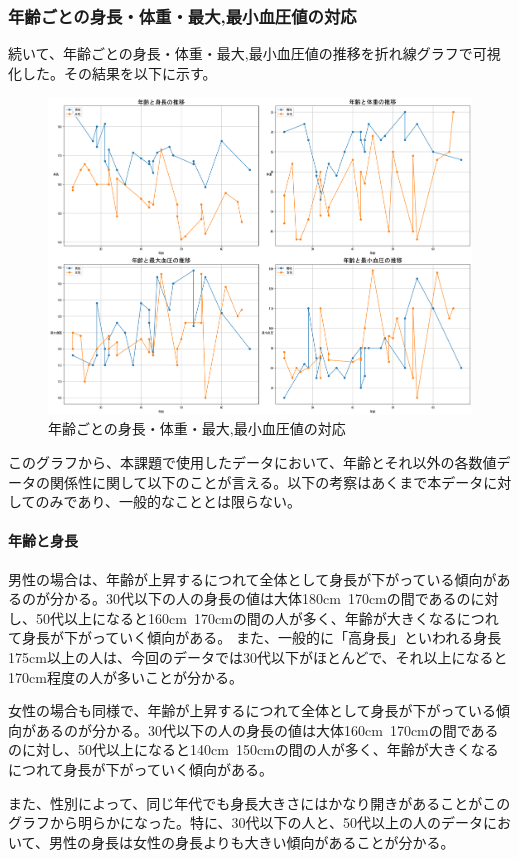 \documentclass[dvipdfmx]{jsarticle}
\begin{document}
    \subsubsection{年齢ごとの身長・体重・最大,最小血圧値の対応}
    続いて、年齢ごとの身長・体重・最大,最小血圧値の推移を折れ線グラフで可視化した。その結果を以下に示す。
    \begin{figure}[H]
        \centering
        \includegraphics[scale=0.32]{images/allgender/age_tarnsition.png}
        \caption{年齢ごとの身長・体重・最大,最小血圧値の対応}
    \end{figure}
    このグラフから、本課題で使用したデータにおいて、年齢とそれ以外の各数値データの関係性に関して以下のことが言える。以下の考察はあくまで本データに対してのみであり、一般的なこととは限らない。
    \paragraph{年齢と身長}
    男性の場合は、年齢が上昇するにつれて全体として身長が下がっている傾向があるのが分かる。30代以下の人の身長の値は大体180cm~170cmの間であるのに対し、50代以上になると160cm~170cmの間の人が多く、年齢が大きくなるにつれて身長が下がっていく傾向がある。
    また、一般的に「高身長」といわれる身長175cm以上の人は、今回のデータでは30代以下がほとんどで、それ以上になると170cm程度の人が多いことが分かる。\par
    女性の場合も同様で、年齢が上昇するにつれて全体として身長が下がっている傾向があるのが分かる。30代以下の人の身長の値は大体160cm~170cmの間であるのに対し、50代以上になると140cm~150cmの間の人が多く、年齢が大きくなるにつれて身長が下がっていく傾向がある。\par
    また、性別によって、同じ年代でも身長大きさにはかなり開きがあることがこのグラフから明らかになった。特に、30代以下の人と、50代以上の人のデータにおいて、男性の身長は女性の身長よりも大きい傾向があることが分かる。
\end{document}
